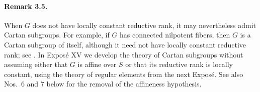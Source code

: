 \paragraph{\textbf{Remark 3.5.}}
When \(G\) does not have locally constant reductive rank, it may
nevertheless admit Cartan subgroups. For example, if \(G\) has
connected nilpotent fibers, then \(G\) is a Cartan subgroup of itself,
although it need not have locally constant reductive rank; see .
In Exposé XV we develop the theory of Cartan subgroups without
assuming either that \(G\) is affine over \(S\) or that its reductive
rank is locally constant, using the theory of regular elements from
the next Exposé. See also Nos.~6 and 7 below for the removal of the
affineness hypothesis.
